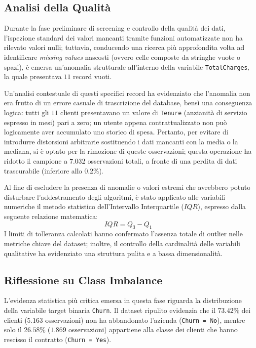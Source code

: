 \documentclass[11pt,a4paper]{article}
\begin{document}
\subsection{Analisi della Qualità}
Durante la fase preliminare di screening e controllo della qualità dei dati, l'ispezione standard dei valori mancanti tramite funzioni automatizzate non ha rilevato valori nulli; tuttavia, conducendo una ricerca più approfondita volta ad identificare \textit{missing values} nascosti (ovvero celle composte da stringhe vuote o spazi), è emersa un'anomalia strutturale all'interno della variabile \texttt{TotalCharges}, la quale presentava $11$ record vuoti. 

Un'analisi contestuale di questi specifici record ha evidenziato che l'anomalia non era frutto di un errore casuale di trascrizione del database, bensì una conseguenza logica: tutti gli $11$ clienti presentavano un valore di \texttt{Tenure} (anzianità di servizio espresso in mesi) pari a zero; un utente appena contrattualizzato non può logicamente aver accumulato uno storico di spesa. Pertanto, per evitare di introdurre distorsioni arbitrarie sostituendo i dati mancanti con la media o la mediana, si è optato per la rimozione  di queste osservazioni; questa operazione ha ridotto il campione a $7.032$ osservazioni totali, a fronte di una perdita di dati trascurabile (inferiore allo $0.2\%$).

Al fine di escludere la presenza di anomalie o valori estremi che avrebbero potuto disturbare l'addestramento degli algoritmi, è stato applicato alle variabili numeriche il metodo statistico dell'Intervallo Interquartile ($IQR$), espresso dalla seguente relazione matematica:
\begin{equation*}
    IQR = Q_3 - Q_1
\end{equation*}
I limiti di tolleranza calcolati hanno confermato l'assenza totale di outlier nelle metriche chiave del dataset; inoltre, il controllo della cardinalità delle variabili qualitative ha evidenziato una struttura pulita e a bassa dimensionalità.

\subsection{Riflessione su Class Imbalance}
L'evidenza statistica più critica emersa in questa fase riguarda la distribuzione della variabile target binaria \texttt{Churn}. Il dataset ripulito evidenzia che il $73.42\%$ dei clienti ($5.163$ osservazioni) non ha abbandonato l'azienda (\texttt{Churn = No}), mentre solo il $26.58\%$ ($1.869$ osservazioni) appartiene alla classe dei clienti che hanno rescisso il contratto (\texttt{Churn = Yes}). 
\end{document}
